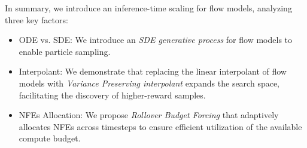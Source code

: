In summary, we introduce an inference-time scaling for flow models, analyzing three key factors:
\begin{itemize}[leftmargin=*]
\item ODE vs. SDE: We introduce an \emph{SDE generative process} for flow models to enable particle sampling. 
\item Interpolant: We demonstrate that replacing the linear interpolant of flow models with \emph{Variance Preserving interpolant} expands the search space, facilitating the discovery of higher-reward samples.
\item NFEs Allocation: We propose \emph{Rollover Budget Forcing} that adaptively allocates NFEs across timesteps to ensure efficient utilization of the available compute budget.

\end{itemize}










